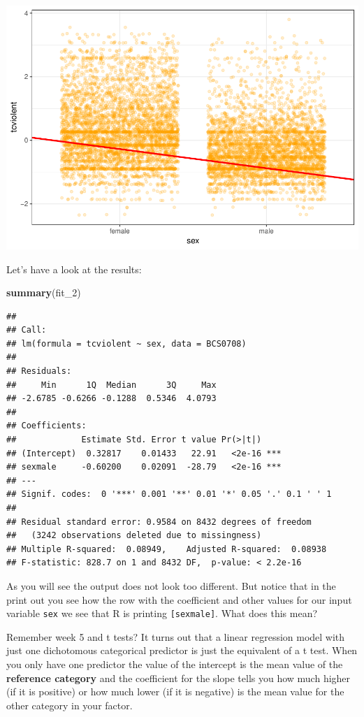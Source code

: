 \documentclass[]{book}
\newenvironment{Shaded}{\begin{snugshade}}{\end{snugshade}}
\newcommand{\DecValTok}[1]{\textcolor[rgb]{0.00,0.00,0.81}{#1}}
\newcommand{\KeywordTok}[1]{\textcolor[rgb]{0.13,0.29,0.53}{\textbf{#1}}}
\newcommand{\NormalTok}[1]{#1}
\theoremstyle{definition}
\theoremstyle{definition}
\theoremstyle{definition}
\theoremstyle{remark}
\begin{document}
\includegraphics{08-regression_files/figure-latex/unnamed-chunk-18-1.pdf}

Let's have a look at the results:

\begin{Shaded}
\begin{Highlighting}[]
\KeywordTok{summary}\NormalTok{(fit_}\DecValTok{2}\NormalTok{)}
\end{Highlighting}
\end{Shaded}

\begin{verbatim}
## 
## Call:
## lm(formula = tcviolent ~ sex, data = BCS0708)
## 
## Residuals:
##     Min      1Q  Median      3Q     Max 
## -2.6785 -0.6266 -0.1288  0.5346  4.0793 
## 
## Coefficients:
##             Estimate Std. Error t value Pr(>|t|)    
## (Intercept)  0.32817    0.01433   22.91   <2e-16 ***
## sexmale     -0.60200    0.02091  -28.79   <2e-16 ***
## ---
## Signif. codes:  0 '***' 0.001 '**' 0.01 '*' 0.05 '.' 0.1 ' ' 1
## 
## Residual standard error: 0.9584 on 8432 degrees of freedom
##   (3242 observations deleted due to missingness)
## Multiple R-squared:  0.08949,    Adjusted R-squared:  0.08938 
## F-statistic: 828.7 on 1 and 8432 DF,  p-value: < 2.2e-16
\end{verbatim}

As you will see the output does not look too different. But notice that
in the print out you see how the row with the coefficient and other
values for our input variable \texttt{sex} we see that R is printing
\texttt{{[}sexmale{]}}. What does this mean?

Remember week 5 and t tests? It turns out that a linear regression model
with just one dichotomous categorical predictor is just the equivalent
of a t test. When you only have one predictor the value of the intercept
is the mean value of the \textbf{reference category} and the coefficient
for the slope tells you how much higher (if it is positive) or how much
lower (if it is negative) is the mean value for the other category in
your factor.
\end{document}
